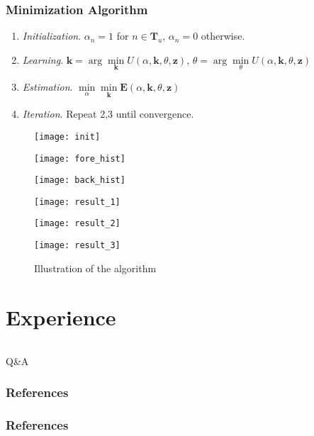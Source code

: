 \documentclass[compress]{beamer} %
\newcommand{\bfE}{\mathbf{E}}
\newcommand{\bfz}{\mathbf{z}}
\begin{document}
 \begin{frame}
  \frametitle{Minimization Algorithm}
  \begin{enumerate}
   \item \textit{Initialization}. $\alpha_n=1$ for $n\in \mathbf{T}_u$, $\alpha_n=0$ otherwise.
   \item \textit{Learning}. $\mathbf{k}=\arg\min\limits_{\mathbf{k}} U(\alpha,\mathbf{k},\theta,\bfz)$, $\theta=\arg\min\limits_{\theta} U(\alpha,\mathbf{k},\theta,\bfz)$
   \item \textit{Estimation}. $\min\limits_{\alpha}\min\limits_{\mathbf{k}}\bfE(\alpha,\mathbf{k},\theta,\bfz) $
   \item \textit{Iteration}. Repeat 2,3 until convergence.
  \end{enumerate}
  \begin{figure}[h!]
    \centering
    \begin{minipage}{0.27\linewidth}
    \texttt{[image: init]}
    \end{minipage}
    \begin{minipage}{0.27\linewidth}
    \texttt{[image: fore\_hist]}
    \end{minipage}
    \begin{minipage}{0.27\linewidth}
    \texttt{[image: back\_hist]}
    \end{minipage}
    \begin{minipage}{0.27\linewidth}
    \texttt{[image: result\_1]}
    \end{minipage}
    \begin{minipage}{0.27\linewidth}
    \texttt{[image: result\_2]}
    \end{minipage}    
    \begin{minipage}{0.27\linewidth}
    \texttt{[image: result\_3]}
    \end{minipage} 
      \caption{Illustration of the algorithm}
  \end{figure}  
 \end{frame}
 
 \section{Experience}
  \begin{frame}
   {\Huge
     \vspace {0.15\textwidth}
     \begin{columns}
       \begin{column}{0.3\textwidth}
       \end{column}
       \begin{column}{0.3\textwidth}
       \end{column}
       \begin{column}{0.3\textwidth}
       \end{column}
     \end{columns}
   }
   \vspace {0.025\textwidth}
   \begin{center}
   {\huge Q\&A}
   \end{center}
 \end{frame}

\begin{frame}\frametitle{References}
\frametitle{References}


\end{frame}
\end{document}
